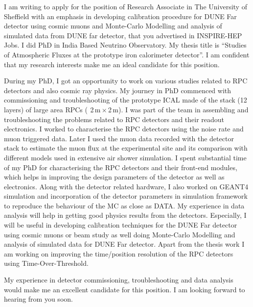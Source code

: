 \documentclass[10pt,stdletter,dateno,sigleft]{newlfm} %
\begin{document}
\begin{newlfm}

  I am writing to apply for the position of Research Associate
  in The University of Sheffield with an emphasis in developing calibration procedure for DUNE Far detector using cosmic muons and Monte-Carlo Modelling and analysis of simulated data from DUNE far detector,
  that you advertised in INSPIRE-HEP Jobs. I did
  PhD in India Based Neutrino Observatory. My thesis title is
  ``Studies of Atmospheric Fluxes at the prototype iron calorimeter
  detector''. I am confident that
  my research interests make me an ideal candidate for this position.

  During my PhD, I got an opportunity to work on various studies
  related to RPC detectors and also cosmic ray physics. My journey in
  PhD commenced with commissioning and troubleshooting of the
  prototype ICAL made of the stack (12 layers) of large area RPCs
  ($~$\,2\,m\,$\times$\,2\,m). I was part of the team in assembling
  and troubleshooting the problems related to RPC detectors and their
  readout electronics. I worked to characterise the RPC detectors using the noise rate and muon triggered data. Later I used the muon data recorded with the
  detector stack to estimate the muon flux at the experimental site
  and its comparison with different models used in extensive air
  shower simulation. 
  I spent substantial time of my PhD for
  characterising the RPC detectors and their front-end modules, which
  helps in improving the design parameters of the detector as well as
  electronics.
  Along with the detector related hardware, I also worked
  on GEANT4
  simulation and incorporation of the detector parameters in
  simulation framework to reproduce the behaviour of the MC as close
  as DATA.
  My experience in data analysis will help in getting good
  physics results from the detectors. Especially, I will be useful in
  developing calibration techniques for the DUNE Far detector using cosmic muons or beam study as well doing Monte-Carlo Modelling and analysis of simulated data for DUNE Far detector.
   Apart from the thesis work I am working on improving the
  time/position resolution of the RPC detectors using
  Time-Over-Threshold. 
  
  My experience in detector commissioning, troubleshooting and data
  analysis would make me an excellent candidate for this position. I am
  looking forward to hearing from you soon.

\end{newlfm}
\end{document}
